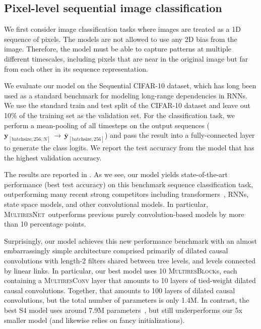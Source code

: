 \documentclass{article}
\theoremstyle{plain}
\theoremstyle{definition}
\theoremstyle{remark}
\newcommand{\ourmodel}{\textsc{MultiresNet}}
\begin{document}
\subsection{Pixel-level sequential image classification}
\label{sec:exp-sCIFAR}

We first consider image classification tasks where images are treated as a 1D sequence of pixels. 
The models are not allowed to use any 2D bias from the  image. 
Therefore, the model must be able to capture patterns at multiple different timescales, including pixels that are near in the original image but far from each other in its sequence representation. 

We evaluate our model on the Sequential CIFAR-10 dataset, which has long been used as a standard benchmark for modeling long-range dependencies in RNNs. 
We use the standard train and test split of the CIFAR-10 dataset and leave out 10\% of the training set as the validation set. 
For the classification task, we perform a mean-pooling of all timesteps on the output sequences ($\mathbf{y}_{[\text{batchsize},256, N]}\, \rightarrow \, \overline{\mathbf{y}}_{[\text{batchsize},256]}$) and pass the result into a fully-connected layer to generate the class logits. 
We report the test accuracy from the model that has the highest validation accuracy. 

The results are reported in . 
As we see, our model yields state-of-the-art performance (best test accuracy) on this benchmark sequence classification task, outperforming many recent strong competitors including transformers~\citep{vaswani2017attention}, RNNs, state space models, and other convolutional models. 
In particular, \ourmodel\ outperforms previous purely convolution-based models by more than 10 percentage points. 

Surprisingly, our model achieves this new performance benchmark with an almost embarrassingly simple architecture comprised primarily of dilated causal convolutions with length-2 filters shared between tree levels, and levels connected by linear links. In particular, our best model uses 10 \textsc{MultiresBlock}s, each containing a \textsc{MultiresConv} layer that amounts to 10 layers of tied-weight dilated causal convolutions. 
Together, that amounts to 100 layers of dilated causal convolutions, but the total number of parameters is only 1.4M. 
In contrast, the best S4 model uses around 7.9M parameters~\citep{gu2021efficiently}, but still underperforms our 5x smaller model (and likewise relies on fancy initializations). 
\end{document}
